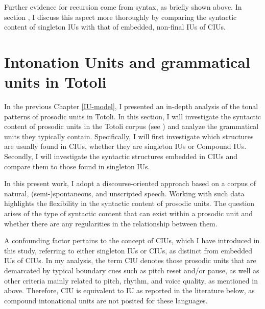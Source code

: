 Further evidence for recursion come from syntax, as briefly shown above. In section , I discuss this aspect more thoroughly by comparing the syntactic content of singleton IUs with that of embedded, non-final IUs of CIUs. 




\section{Intonation Units and grammatical units in Totoli}
\label{sec:the-syntax-of-intonation-units}


In the previous Chapter  \ref{IU-model}, I presented an in-depth analysis of the tonal patterns of prosodic units in Totoli. In this section, I will investigate the syntactic content of prosodic units in the Totoli corpus (see ) and analyze the grammatical units they typically contain. Specifically, I will first investigate which structures are usually found in CIUs, whether they are singleton IUs or Compound IUs. Secondly, I will investigate the syntactic structures embedded in CIUs and compare them to those found in singleton IUs.




In this present work, I adopt a discourse-oriented approach based on a corpus of natural, (semi-)spontaneous, and unscripted speech. Working with such data highlights the  flexibility in the syntactic content of prosodic units. The question arises of the type of syntactic content that can exist within a prosodic unit and whether there are any regularities in the relationship between them.



A confounding factor pertains to the concept of CIUs, which I have introduced in this study, referring to either singleton IUs or CIUs, as distinct from embedded IUs of CIUs. In my analysis, the term CIU denotes those prosodic units that are demarcated by typical boundary cues such as pitch reset and/or pause, as well as other criteria mainly related to pitch, rhythm, and voice quality, as mentioned in   above. Therefore, CIU is equivalent to IU as reported in the literature below, as compound intonational units are not posited for these languages.




